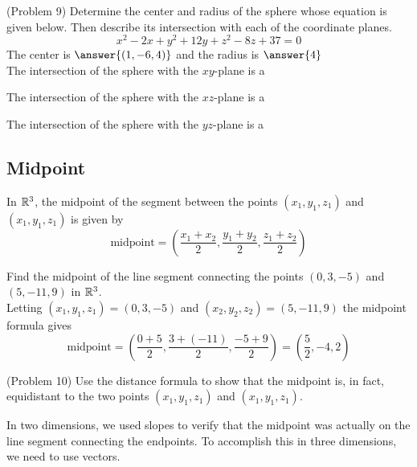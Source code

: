 \documentclass[handout]{ximera}
\begin{document}
\begin{problem}(Problem 9)
Determine the center and radius of the sphere whose equation is given below.  
Then describe its intersection with each of the coordinate planes.
\[
x^2 - 2x + y^2 + 12y + z^2 - 8z +37 = 0
\]
The center is $\answer{(1, -6, 4)}$ and the radius is $\answer{4}$\\
The intersection of the sphere with the $xy$-plane is a 
\begin{multipleChoice}
\end{multipleChoice}

The intersection of the sphere with the $xz$-plane is a 
\begin{multipleChoice}
\end{multipleChoice}

The intersection of the sphere with the $yz$-plane is a 
\begin{multipleChoice}
\end{multipleChoice}

\end{problem}


\subsection{Midpoint}
In $\mathbb R^3$, the midpoint of the segment between the points $(x_1, y_1, z_1)$ and $(x_1, y_1, z_1)$ is given by 
\[
\text{midpoint} = \left(\frac{x_1 + x_2}{2}, \frac{y_1 + y_2}{2}, \frac{z_1 + z_2}{2}\right)
\]

\begin{example}[Example 10]
Find the midpoint of the line segment connecting the points $(0,3,-5)$ and $(5,-11,9)$ in $\mathbb R^3$.\\
Letting $(x_1, y_1, z_1) = (0,3,-5)$ and $(x_2, y_2, z_2) = (5,-11,9)$ the midpoint formula gives
\[
\text{midpoint} = \left(\frac{0+5}{2}, \frac{3+(-11)}{2}, \frac{-5+9}{2}\right) = \left(\frac{5}{2}, -4,2\right)
\]
\end{example}

\begin{problem}(Problem 10)
Use the distance formula to show that the midpoint is, in fact, 
equidistant to the two points $(x_1, y_1, z_1)$ and $(x_1, y_1, z_1)$.
\end{problem}

In two dimensions, we used slopes to verify that the midpoint was actually on the line segment connecting the endpoints.  
To accomplish this in three dimensions, we need to use vectors.
\end{document}
